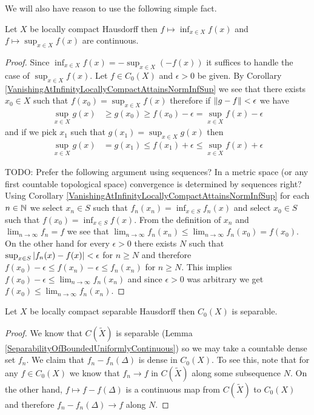 We will also have reason to use the following simple fact.
\begin{cor}\label{VanishingAtInfinityLocallyCompactSupInfContinuity}Let $X$ be locally compact Hausdorff then $f \mapsto \inf_{x \in X} f(x)$ and $f \mapsto \sup_{x \in X} f(x)$ are 
continuous.
\end{cor}
\begin{proof}
Since $\inf_{x \in X} f(x) = - \sup_{x \in X} (-f(x))$ it suffices to handle the case of $\sup_{x \in X} f(x)$.  Let $f \in C_0(X)$ and $\epsilon > 0$ be given.  By Corollary \ref{VanishingAtInfinityLocallyCompactAttainsNormInfSup} we see that there exists $x_0 \in X$ such that $f(x_0) = \sup_{x \in X} f(x)$ therefore if $\left \lVert g - f \right \rVert < \epsilon$
we have 
\begin{align*}
\sup_{x \in X} g(x) &\geq g(x_0) \geq f(x_0) - \epsilon = \sup_{x \in X} f(x) - \epsilon
\end{align*}
and if we pick $x_1$ such that $g(x_1) = \sup_{x \in X} g(x)$ then
\begin{align*}
\sup_{x \in X} g(x) &= g(x_1) \leq f(x_1) + \epsilon \leq \sup_{x \in X} f(x)  + \epsilon
\end{align*}

TODO: Prefer the following argument using sequences?  In a metric space (or any first countable topological space) convergence is determined by sequences right?
Using Corollary \ref{VanishingAtInfinityLocallyCompactAttainsNormInfSup}  for each $n \in \mathbb{N}$ we select
$x_n \in S$ such that $f_n(x_n) = \inf_{x \in S} f_n(x)$ and select $x_0 \in S$ such that $f(x_0) = \inf_{x \in S} f(x)$.  From the definition of $x_n$ and $\lim_{n \to \infty} f_n = f$ we see that $\lim_{n \to \infty} f_n(x_n) \leq \lim_{n \to \infty} f_n(x_0) = f(x_0)$.  On the other hand for every $\epsilon > 0$
there exists $N$ such that $\sup_{x \in S} \left \vert f_n(x) - f(x) \right \vert < \epsilon$ for $n \geq N$ and therefore $f(x_0) - \epsilon \leq f(x_n) - \epsilon \leq f_n(x_n)$ for $n \geq N$.  This implies $f(x_0) - \epsilon \leq \lim_{n \to \infty} f_n(x_n)$ and since $\epsilon >0$ was arbitrary we get $f(x_0) \leq \lim_{n \to \infty} f_n(x_n)$.
\end{proof}

\begin{cor}\label{VanishingAtInfinityLocallyCompactSeparable}Let $X$
  be locally compact separable Hausdorff then $C_0(X)$ is separable.
\end{cor}
\begin{proof}
We know that $C(\tilde{X})$ is separable (Lemma
\ref{SeparabilityOfBoundedUniformlyContinuous}) so we may take a
countable dense set $f_n$.  We claim that $f_n - f_n(\Delta)$ is dense
in $C_0(X)$.  To see this, note that for any $f \in C_0(X)$ we know
that $f_n \to f$ in $C(\tilde{X})$ along some subsequence $N$.  On the
other hand, $f \mapsto f - f(\Delta)$ is a continuous map from
$C(\tilde{X})$ to $C_0(X)$ and therefore $f_n - f_n(\Delta) \to f$
along $N$.
\end{proof}

